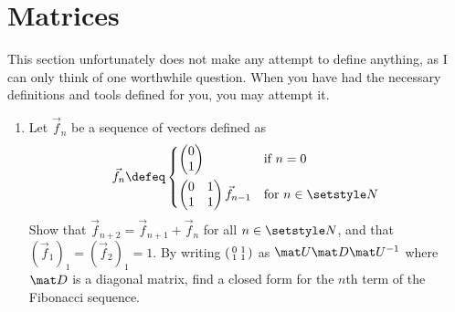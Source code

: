 \section{Matrices}

This section unfortunately does not make any attempt to define anything, as I
can only think of one worthwhile question. When you have had the necessary
definitions and tools defined for you, you may attempt it.
\begin{enumerate}
 \item
  Let \(\vec f_n\) be a sequence of vectors defined as
  \begin{equation*}
   \vec f_n \defeq
   \begin{cases*}
    \begin{pmatrix} 0 \\ 1 \end{pmatrix} &
     if \(n = 0\) \\
    \begin{pmatrix} 0 & 1 \\ 1 & 1 \end{pmatrix}\vec f_{n - 1} &
     for \(n \in \Naturals\)
   \end{cases*}
  \end{equation*}
  Show that
  \(\vec f_{n + 2} = \vec f_{n + 1} + \vec f_n\) for all
  \(n \in \Naturals\), and that \((\vec f_1)_1 = (\vec f_2)_1 = 1\). By
  writing \(\begin{psmallmatrix} 0 & 1 \\ 1 & 1 \end{psmallmatrix}\) as
  \(\mat U \mat D \mat U^{-1}\) where \(\mat D\) is a diagonal matrix,
  find a closed form for the \(n\)th term of the Fibonacci sequence.
\end{enumerate}
